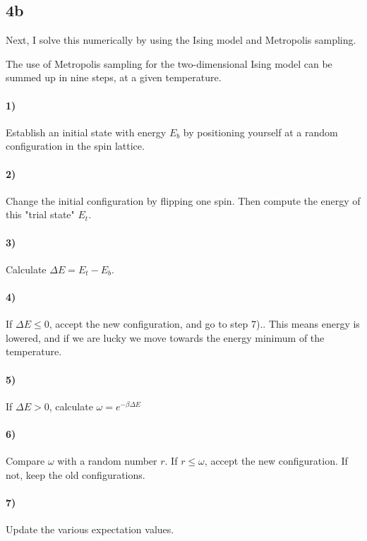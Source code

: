 \documentclass[10pt,showpacs,preprintnumbers,footinbib,amsmath,amssymb,aps,prl,twocolumn,groupedaddress,superscriptaddress,showkeys]{revtex4-1}
\newcommand{\Exp}[1]{e^{#1}}
\begin{document}
\subsection*{4b}

Next, I solve this numerically by using the Ising model and Metropolis sampling.

The use of Metropolis sampling for the two-dimensional Ising model can be summed up in nine steps, at a given temperature.

\paragraph{1)} Establish an initial state with energy $E_b$ by positioning yourself at a random configuration in the spin lattice.

\paragraph{2)} Change the initial configuration by flipping one spin. Then compute the energy of this "trial state" $E_t$.

\paragraph{3)} Calculate $\Delta E = E_t - E_b$.

\paragraph{4)} If $\Delta E \leq 0$, accept the new configuration, and go to step 7).. This means energy is lowered, and if we are lucky we move towards the energy minimum of the temperature.

\paragraph{5)} If $\Delta E > 0$, calculate $\omega = \Exp{-\beta\Delta E}$

\paragraph{6)} Compare $\omega$ with a random number $r$. If $r \leq \omega$, accept the new configuration. If not, keep the old configurations.

\paragraph{7)} Update the various expectation values.
\end{document}
